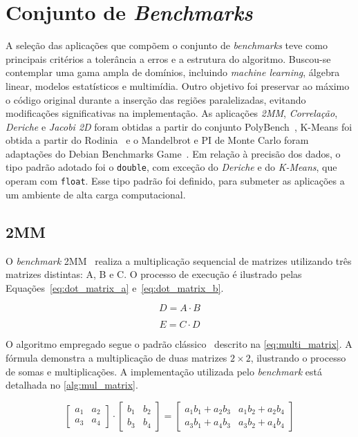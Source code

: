\section{Conjunto de \textit{Benchmarks}}\label{sec:benchmark}

A seleção das aplicações que compõem o conjunto de \textit{benchmarks} teve como principais critérios a tolerância a erros e a estrutura do algoritmo. Buscou-se contemplar uma gama ampla de domínios, incluindo \textit{machine learning}, álgebra linear, modelos estatísticos e multimídia. Outro objetivo foi preservar ao máximo o código original durante a inserção das regiões paralelizadas, evitando modificações significativas na implementação. As aplicações \emph{2MM}, \emph{Correlação}, \emph{Deriche} e \emph{Jacobi 2D} foram obtidas a partir do conjunto PolyBench~\cite{polybench}, K-Means foi obtida a partir do Rodinia~\cite{rodinia} e o Mandelbrot e PI de Monte Carlo foram adaptações do Debian Benchmarks Game~\cite{debianBenchmarksGame}. Em relação à precisão dos dados, o tipo padrão adotado foi o \texttt{double}, com exceção do \emph{Deriche} e do \emph{K-Means}, que operam com \texttt{float}. Esse tipo padrão foi definido, para submeter as aplicações a um ambiente de alta carga computacional.

\subsection{2MM}\label{subsec:2mm}

O \textit{benchmark} 2MM~\cite{polybench} realiza a multiplicação sequencial de matrizes utilizando três matrizes distintas: A, B e C. O processo de execução é ilustrado pelas Equações~\ref{eq:dot_matrix_a} e~\ref{eq:dot_matrix_b}.

\begin{equation}
	\label{eq:dot_matrix_a}
	D = A \cdot B
\end{equation}

\begin{equation}
	\label{eq:dot_matrix_b}
	E = C \cdot D
\end{equation}

O algoritmo empregado segue o padrão clássico~\cite{axler2015} descrito na \autoref{eq:multi_matrix}. A fórmula demonstra a multiplicação de duas matrizes $2\times2$, ilustrando o processo de somas e multiplicações. A implementação utilizada pelo \textit{benchmark} está detalhada no \autoref{alg:mul_matrix}.

\begin{equation}
	\label{eq:multi_matrix}
	\begin{bmatrix}
		a_1 & a_2 \\
		a_3 & a_4
	\end{bmatrix}
	\cdot
	\begin{bmatrix}
		b_1 & b_2 \\
		b_3 & b_4
	\end{bmatrix}
	=
	\begin{bmatrix}
		a_1b_1 + a_2b_3 & a_1b_2 + a_2b_4 \\
		a_3b_1 + a_4b_3 & a_3b_2 + a_4b_4
	\end{bmatrix}
\end{equation}

